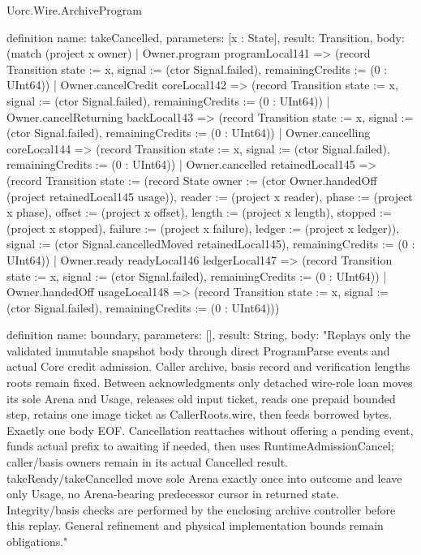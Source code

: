 \begin{lexlean}{Uorc.Wire.ArchiveProgram}
\begin{semanticmodule}
definition{
  name: takeCancelled,
  parameters: [x : State],
  result: Transition,
  body: (match (project x owner)
    | Owner.program programLocal141 => (record Transition {state := x, signal := (ctor Signal.failed), remainingCredits := (0 : UInt64)})
    | Owner.cancelCredit coreLocal142 => (record Transition {state := x, signal := (ctor Signal.failed), remainingCredits := (0 : UInt64)})
    | Owner.cancelReturning backLocal143 => (record Transition {state := x, signal := (ctor Signal.failed), remainingCredits := (0 : UInt64)})
    | Owner.cancelling coreLocal144 => (record Transition {state := x, signal := (ctor Signal.failed), remainingCredits := (0 : UInt64)})
    | Owner.cancelled retainedLocal145 => (record Transition {state := (record State {owner := (ctor Owner.handedOff (project retainedLocal145 usage)), reader := (project x reader), phase := (project x phase), offset := (project x offset), length := (project x length), stopped := (project x stopped), failure := (project x failure), ledger := (project x ledger)}), signal := (ctor Signal.cancelledMoved retainedLocal145), remainingCredits := (0 : UInt64)})
    | Owner.ready readyLocal146 ledgerLocal147 => (record Transition {state := x, signal := (ctor Signal.failed), remainingCredits := (0 : UInt64)})
    | Owner.handedOff usageLocal148 => (record Transition {state := x, signal := (ctor Signal.failed), remainingCredits := (0 : UInt64)}))
}

definition{
  name: boundary,
  parameters: [],
  result: String,
  body: "Replays only the validated immutable snapshot body through direct ProgramParse events and actual Core credit admission. Caller archive, basis record and verification lengths roots remain fixed. Between acknowledgments only detached wire-role loan moves its sole Arena and Usage, releases old input ticket, reads one prepaid bounded step, retains one image ticket as CallerRoots.wire, then feeds borrowed bytes. Exactly one body EOF. Cancellation reattaches without offering a pending event, funds actual prefix to awaiting if needed, then uses RuntimeAdmissionCancel; caller/basis owners remain in its actual Cancelled result. takeReady/takeCancelled move sole Arena exactly once into outcome and leave only Usage, no Arena-bearing predecessor cursor in returned state. Integrity/basis checks are performed by the enclosing archive controller before this replay. General refinement and physical implementation bounds remain obligations."
}
\end{semanticmodule}
\end{lexlean}

